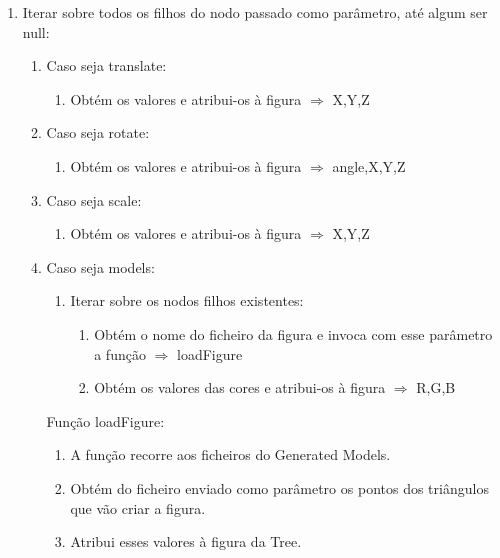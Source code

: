 \documentclass[a4paper]{article}
\begin{document}
\begin{enumerate}
 \item Iterar sobre todos os filhos do nodo passado como parâmetro, até algum ser null:

   \begin{enumerate}
     \item Caso seja translate:
        \begin{enumerate}
          \item Obtém os valores e atribui-os à figura $\Rightarrow$ X,Y,Z
        \end{enumerate}
     \item Caso seja rotate:
        \begin{enumerate}
          \item Obtém os valores e atribui-os à figura $\Rightarrow$ angle,X,Y,Z
        \end{enumerate}
     \item Caso seja scale:
        \begin{enumerate}
          \item Obtém os valores e atribui-os à figura $\Rightarrow$ X,Y,Z
        \end{enumerate}
     \item Caso seja models:
        \begin{enumerate}
          \item Iterar sobre os nodos filhos existentes:
              \begin{enumerate}
                \item Obtém o nome do ficheiro da figura e invoca com esse parâmetro a função $\Rightarrow$ loadFigure
                \item Obtém os valores das cores e atribui-os à figura $\Rightarrow$ R,G,B
              \end{enumerate}
        \end{enumerate}

    \vspace{0.3cm}

  Função loadFigure:

    \vspace{0.3cm}

        \begin{enumerate}
          \item A função recorre aos ficheiros do Generated Models.
          \item Obtém do ficheiro enviado como parâmetro os pontos dos triângulos que vão criar a figura.
          \item Atribui esses valores à figura da Tree.
        \end{enumerate}


\end{enumerate}
\end{enumerate}
\end{document}

